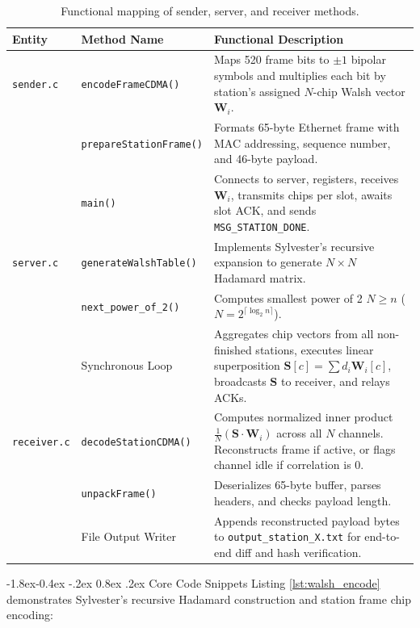 \documentclass[11pt,a4paper]{article}
\makeatletter
\renewcommand\subsection{\@startsection{subsection}{2}{\z@}%
                                     {-1.8ex\@plus -0.4ex \@minus -.2ex}%
                                     {0.8ex \@plus .2ex}%
                                     {\normalfont\large\bfseries}}
\makeatother
\begin{document}
\begin{table}[H]
    \centering
    \small
    \begin{tabularx}{\textwidth}{llX}
        \toprule
        \textbf{Entity} & \textbf{Method Name} & \textbf{Functional Description} \\
        \midrule
        \texttt{sender.c} & \texttt{encodeFrameCDMA()} & Maps 520 frame bits to $\pm 1$ bipolar symbols and multiplies each bit by station's assigned $N$-chip Walsh vector $\mathbf{W}_i$. \\
        & \texttt{prepareStationFrame()} & Formats 65-byte Ethernet frame with MAC addressing, sequence number, and 46-byte payload. \\
        & \texttt{main()} & Connects to server, registers, receives $\mathbf{W}_i$, transmits chips per slot, awaits slot ACK, and sends \texttt{MSG\_STATION\_DONE}. \\
        \midrule
        \texttt{server.c} & \texttt{generateWalshTable()} & Implements Sylvester's recursive expansion to generate $N \times N$ Hadamard matrix. \\
        & \texttt{next\_power\_of\_2()} & Computes smallest power of 2 $N \ge n$ ($N = 2^{\lceil \log_2 n \rceil}$). \\
        & Synchronous Loop & Aggregates chip vectors from all non-finished stations, executes linear superposition $\mathbf{S}[c] = \sum d_i \mathbf{W}_i[c]$, broadcasts $\mathbf{S}$ to receiver, and relays ACKs. \\
        \midrule
        \texttt{receiver.c} & \texttt{decodeStationCDMA()} & Computes normalized inner product $\frac{1}{N}(\mathbf{S} \cdot \mathbf{W}_i)$ across all $N$ channels. Reconstructs frame if active, or flags channel idle if correlation is 0. \\
        & \texttt{unpackFrame()} & Deserializes 65-byte buffer, parses headers, and checks payload length. \\
        & File Output Writer & Appends reconstructed payload bytes to \texttt{output\_station\_X.txt} for end-to-end diff and hash verification. \\
        \bottomrule
    \end{tabularx}
    \caption{Functional mapping of sender, server, and receiver methods.}
    \label{tab:methods}
\end{table}

\subsection{Core Code Snippets}
Listing \ref{lst:walsh_encode} demonstrates Sylvester's recursive Hadamard construction and station frame chip encoding:
\end{document}
